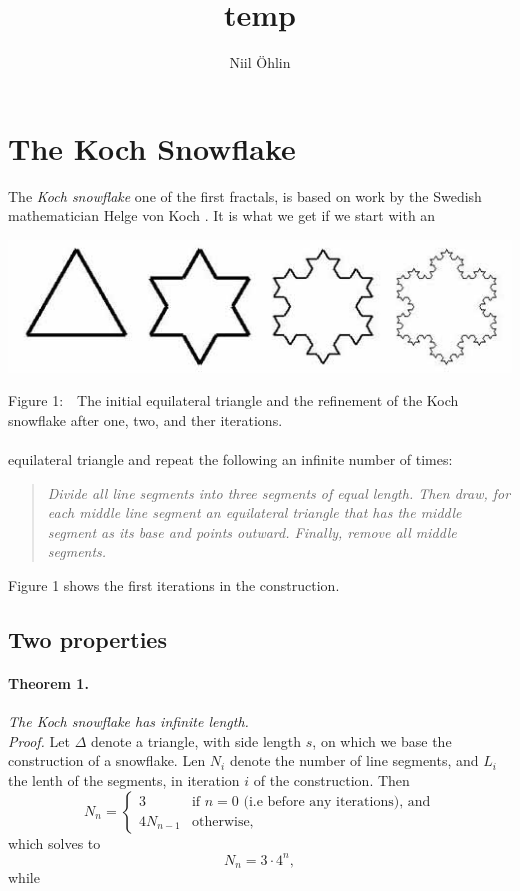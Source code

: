 \documentclass[a4paper]{article}
\begin{document}
\title{temp}
\author{Niil Öhlin}
\date{}
\maketitle

\section{The Koch Snowflake}
The \emph{Koch snowflake} one of the first fractals, is based on work by the
Swedish mathematician Helge von Koch \cite{aoeu}. It is what we get if we
start with an 
\begin{center}
	\includegraphics[scale=0.4]{snowflake.jpg}
\end{center}
Figure 1:$\quad$The initial equilateral triangle and the refinement of the Koch
snowflake after one, two, and ther iterations.\\
\\
equilateral triangle and repeat the following an infinite number of times:

\begin{quote}
\emph{Divide all line segments into three segments of equal length. Then draw,
	for each middle line segment an equilateral triangle that has the middle
	segment as its base and points outward. Finally, remove all middle segments.
	}
\end{quote}
Figure 1 shows the first iterations in the construction. 


\subsection{Two properties}
\paragraph{Theorem 1.} \emph{The Koch snowflake has infinite length.}\\
\emph{Proof.} Let $\Delta$ denote a triangle, with side length $s$, on which
we base the construction of a snowflake. Len $N_i$ denote the number of line
segments, and $L_i$ the lenth of the segments, in iteration $i$ of the 
construction. Then
$$
	N_n = 
	\begin{cases}
		3 &\text{if } n = 0 \text{ (i.e before any iterations), and} \\
		4N_{n-1} &\text{otherwise,}
	\end{cases}
$$
which solves to
\begin{equation}
	N_n = 3 \cdot 4^n,
\end{equation}
while
\newcommand{\uberfrac}[1]{
	= \frac {L_{n - #1}} {3^#1}
}
\end{document}
